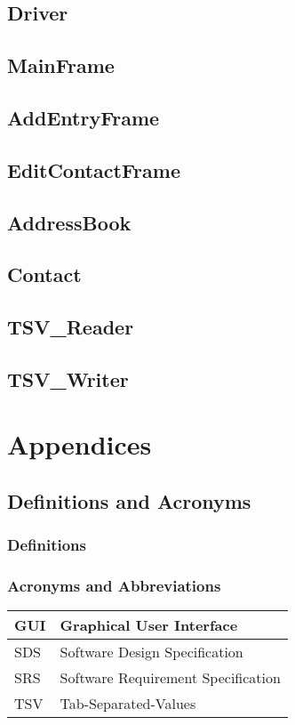 \documentclass[a4paper, 11pt]{article}
\begin{document}
\subsection{Driver}
\subsection{MainFrame}
\subsection{AddEntryFrame}
\subsection{EditContactFrame}

\subsection{AddressBook}
\subsection{Contact}
\subsection{TSV\_Reader}
\subsection{TSV\_Writer}

\section{Appendices}

\subsection{Definitions and Acronyms}
\subsubsection{Definitions}
\subsubsection{Acronyms and Abbreviations}

	\begin{tabular}{ | m{1cm} | m{10cm} | } 
		\hline
		GUI & Graphical User Interface \\
		\hline
		SDS & Software Design Specification \\
		\hline
		SRS & Software Requirement Specification  \\
		\hline
		TSV & Tab-Separated-Values \\
		\hline
	\end{tabular}
\end{document}
